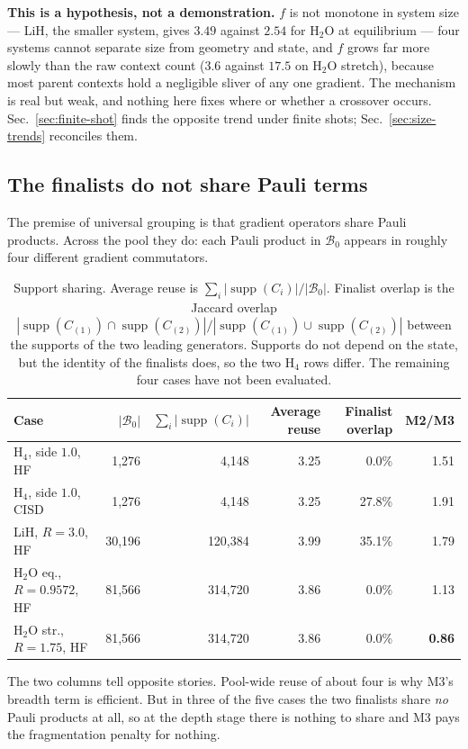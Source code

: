 \documentclass[10pt]{article}
\newcommand{\supp}{\operatorname{supp}}
\begin{document}
\textbf{This is a hypothesis, not a demonstration.} $f$ is not monotone in system size --- LiH, the smaller system, gives $3.49$ against $2.54$ for H$_2$O at equilibrium --- four systems cannot separate size from geometry and state, and $f$ grows far more slowly than the raw context count ($3.6$ against $17.5$ on H$_2$O stretch), because most parent contexts hold a negligible sliver of any one gradient. The mechanism is real but weak, and nothing here fixes where or whether a crossover occurs. Sec.~\ref{sec:finite-shot} finds the opposite trend under finite shots; Sec.~\ref{sec:size-trends} reconciles them.

\subsection{The finalists do not share Pauli terms}
\label{sec:overlap}

The premise of universal grouping is that gradient operators share Pauli products. Across the pool they do: each Pauli product in $\mathcal B_0$ appears in roughly four different gradient commutators.

\begin{table}[!htbp]
\centering
\scriptsize
\caption{Support sharing. Average reuse is $\sum_i|\supp(C_i)|/|\mathcal B_0|$. Finalist overlap is the Jaccard overlap $|\supp(C_{(1)})\cap\supp(C_{(2)})|/|\supp(C_{(1)})\cup\supp(C_{(2)})|$ between the supports of the two leading generators. Supports do not depend on the state, but the identity of the finalists does, so the two H$_4$ rows differ. The remaining four cases have not been evaluated.}
\label{tab:overlap}
\begin{tabular}{lrrrrr}
\toprule
Case & $|\mathcal B_0|$ & $\sum_i|\supp(C_i)|$ & Average reuse & Finalist overlap & M2/M3 \\
\midrule
H$_4$, side $1.0$, HF & 1,276 & 4,148 & 3.25 & 0.0\% & 1.51 \\
H$_4$, side $1.0$, CISD & 1,276 & 4,148 & 3.25 & 27.8\% & 1.91 \\
LiH, $R{=}3.0$, HF & 30,196 & 120,384 & 3.99 & 35.1\% & 1.79 \\
H$_2$O eq., $R{=}0.9572$, HF & 81,566 & 314,720 & 3.86 & 0.0\% & 1.13 \\
H$_2$O str., $R{=}1.75$, HF & 81,566 & 314,720 & 3.86 & 0.0\% & \textbf{0.86} \\
\bottomrule
\end{tabular}
\end{table}

The two columns tell opposite stories. Pool-wide reuse of about four is why M3's breadth term is efficient. But in three of the five cases the two finalists share \emph{no} Pauli products at all, so at the depth stage there is nothing to share and M3 pays the fragmentation penalty for nothing.
\end{document}

